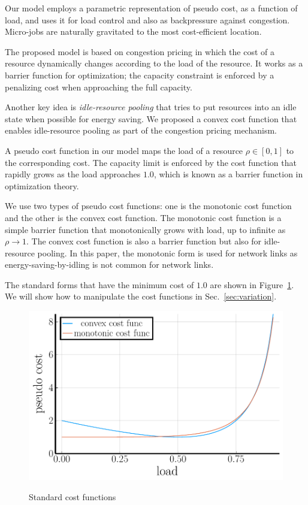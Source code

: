 
Our model employs a parametric representation of pseudo cost, as a
function of load, and uses it for load control and also as
backpressure against congestion.
Micro-jobs are naturally gravitated to the most cost-efficient
location.

The proposed model is based on congestion pricing in which the cost of
a resource dynamically changes according to the load of the resource.
It works as a barrier function for optimization; the capacity
constraint is enforced by a penalizing cost when approaching the full
capacity.

Another key idea is {\em idle-resource pooling} that tries to put resources
into an idle state when possible for energy saving.
We proposed a convex cost function that enables idle-resource pooling
as part of the congestion pricing mechanism.

A pseudo cost function in our model maps the load of a resource
$\rho \in [0, 1]$ to the corresponding cost.
The capacity limit is enforced by the cost function that rapidly grows
as the load approaches $1.0$, which is known as a barrier function in
optimization theory. 

We use two types of pseudo cost functions: one is the monotonic cost
function and the other is the convex cost function.
The monotonic cost function is a simple barrier function that
monotonically grows with load, up to infinite as $\rho \to 1$.
The convex cost function is also a barrier function but also for
idle-resource pooling.
In this paper, the monotonic form is used for network links as
energy-saving-by-idling is not common for network links.

The standard forms that have the minimum cost of $1.0$ are
shown in Figure~\ref{fig:std_costfunc}. We will show how to manipulate
the cost functions in Sec.~\ref{sec:variation}.

\begin{figure}[tb]
  \begin{center}
    \includegraphics[width=0.9\columnwidth]{pseudo_costs.pdf}
    \vspace{-2.0ex}
    \caption{Standard cost functions}
    \label{fig:std_costfunc}
  \end{center}
\end{figure}

